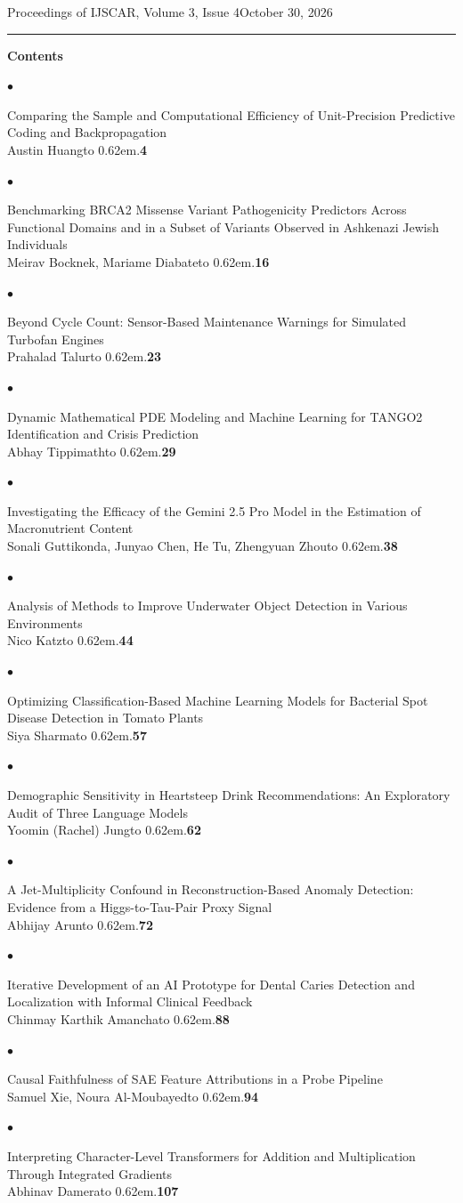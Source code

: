\documentclass[10pt,letterpaper]{article}
\newcommand{\entry}[3]{%
  \noindent$\bullet$\hspace{0.45em}\begin{minipage}[t]{\dimexpr\linewidth-1.25em\relax}
  \raggedright #1\\
  #2\leaders\hbox to 0.62em{\hss.\hss}\hfill\textbf{#3}%
  \end{minipage}\par\vspace{2.6ex}}
\begin{document}
\noindent Proceedings of IJSCAR, Volume 3, Issue 4\hfill October 30, 2026\par\vspace{-1.3ex}
\noindent\rule{\linewidth}{0.4pt}
\vspace{3ex}

{\Large\bfseries Contents}
\vspace{3.4ex}

\entry{Comparing the Sample and Computational Efficiency of Unit-Precision Predictive Coding and Backpropagation}{Austin Huang}{4}
\entry{Benchmarking BRCA2 Missense Variant Pathogenicity Predictors Across Functional Domains and in a Subset of Variants Observed in Ashkenazi Jewish Individuals}{Meirav Bocknek, Mariame Diabate}{16}
\entry{Beyond Cycle Count: Sensor-Based Maintenance Warnings for Simulated Turbofan Engines}{Prahalad Talur}{23}
\entry{Dynamic Mathematical PDE Modeling and Machine Learning for TANGO2 Identification and Crisis Prediction}{Abhay Tippimath}{29}
\entry{Investigating the Efficacy of the Gemini 2.5 Pro Model in the Estimation of Macronutrient Content}{Sonali Guttikonda, Junyao Chen, He Tu, Zhengyuan Zhou}{38}
\entry{Analysis of Methods to Improve Underwater Object Detection in Various Environments}{Nico Katz}{44}
\entry{Optimizing Classification-Based Machine Learning Models for Bacterial Spot Disease Detection in Tomato Plants}{Siya Sharma}{57}
\entry{Demographic Sensitivity in Heartsteep Drink Recommendations: An Exploratory Audit of Three Language Models}{Yoomin (Rachel) Jung}{62}
\entry{A Jet-Multiplicity Confound in Reconstruction-Based Anomaly Detection: Evidence from a Higgs-to-Tau-Pair Proxy Signal}{Abhijay Arun}{72}
\entry{Iterative Development of an AI Prototype for Dental Caries Detection and Localization with Informal Clinical Feedback}{Chinmay Karthik Amancha}{88}
\entry{Causal Faithfulness of SAE Feature Attributions in a Probe Pipeline}{Samuel Xie, Noura Al-Moubayed}{94}
\entry{Interpreting Character-Level Transformers for Addition and Multiplication Through Integrated Gradients}{Abhinav Damera}{107}
\end{document}
